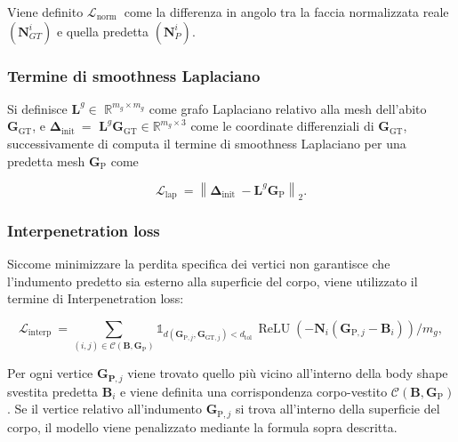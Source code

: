 Viene definito $\mathcal{L}_{\text {norm }}$ come la differenza in angolo tra la faccia normalizzata reale $\left(\mathbf{N}_{G T}^{i}\right)$ e quella predetta $\left(\mathbf{N}_{P}^{i}\right)$.

\medskip

\subsubsection{Termine di smoothness Laplaciano}

\medskip

Si definisce $\mathbf{L}^{g} \in$ $\mathbb{R}^{m_{g} \times m_{g}}$ come grafo Laplaciano relativo alla mesh dell'abito $\mathbf{G}_{\mathrm{GT}}$, e $\boldsymbol{\Delta}_{\text {init }}=$ $\mathbf{L}^{g} \mathbf{G}_{\mathrm{GT}} \in \mathbb{R}^{m_{g} \times 3}$ come le coordinate differenziali di $\mathbf{G}_{\mathrm{GT}}$, successivamente di computa il termine di smoothness Laplaciano per una predetta mesh $\mathbf{G}_{\mathrm{P}}$ come 

\medskip

$$
\mathcal{L}_{\text {lap }}=\left\|\boldsymbol{\Delta}_{\text {init }}-\mathbf{L}^{g} \mathbf{G}_{\mathrm{P}}\right\|_{2} .
$$

\medskip

\subsubsection{Interpenetration loss}

\medskip

Siccome minimizzare la perdita specifica dei vertici non garantisce che l'indumento predetto sia esterno alla superficie del corpo, viene utilizzato il termine di Interpenetration loss: 

$$
\mathcal{L}_{\text {interp }}=\sum_{(i, j) \in \mathcal{C}\left(\mathbf{B}, \mathbf{G}_{\mathrm{P}}\right)} \mathbb{1}_{d\left(\mathbf{G}_{\mathrm{P}, j}, \boldsymbol{G}_{\mathrm{GT}, j}\right)<d_{\text {tol }}} \operatorname{ReLU}\left(-\mathbf{N}_{i}\left(\mathbf{G}_{\mathrm{P}, j}-\mathbf{B}_{i}\right)\right) / m_{g},
$$

\medskip

Per ogni vertice $\mathbf{G}_{\mathbf{P}, j}$ viene trovato quello più vicino all'interno della body shape svestita predetta  $\mathbf{B}_{i}$ e viene definita una corrispondenza corpo-vestito $\mathcal{C}\left(\mathbf{B}, \mathbf{G}_{\mathrm{P}}\right)$. Se il vertice relativo all'indumento $\mathbf{G}_{\mathrm{P}, j}$ si trova all'interno della superficie del corpo, il modello viene penalizzato mediante la formula sopra descritta.


